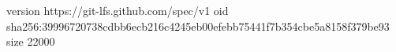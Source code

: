 version https://git-lfs.github.com/spec/v1
oid sha256:39996720738cdbb6ecb216c4245eb00efebb75441f7b354cbe5a8158f379be93
size 22000
